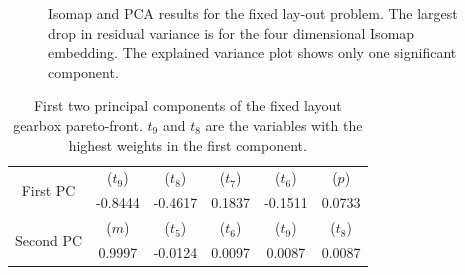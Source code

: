 
\begin{figure}[ht]\begin{center}
\caption{Isomap and PCA results for the fixed lay-out problem. The largest
  drop in residual variance is for the four dimensional Isomap
  embedding. The explained variance plot shows only one significant
  component.}
 \label{gt11rv}
\end{center}\end{figure}
 
\begin{table}[!ht]
  \centering
  \begin{tabular}{|c|c|c|c|c|c|}
    \hline
    \multirow{2}{*}{First PC}   & ($t_9$) &  ($t_8$) &  ($t_7$)  & ($t_6$) & ($p$)\\
    & -0.8444  & -0.4617  & 0.1837 & -0.1511 & 0.0733  \\
    \hline
    \multirow{2}{*}{Second PC}   & ($m$) &  ($t_5$) &  ($t_6$)  & ($t_9$) & ($t_8$)\\
    & 0.9997 & -0.0124 & 0.0097 & 0.0087 &  0.0087 \\
    \hline
  \end{tabular}
  \caption{First two principal components of the fixed layout gearbox pareto-front. $t_9$ and $t_8$ are the variables with the highest weights in the first component.}
  \label{first2GTPCs}
\end{table}

